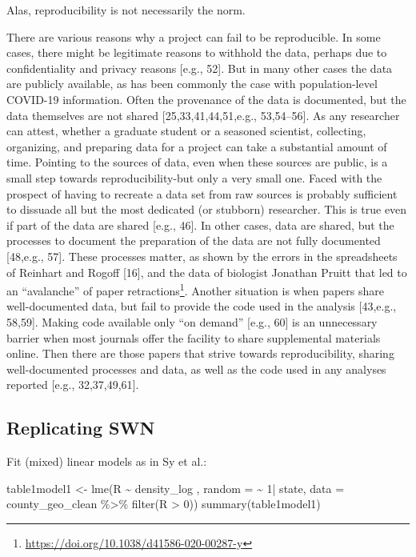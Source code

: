 \documentclass[10pt,letterpaper]{article}
\newenvironment{Shaded}{\begin{snugshade}}{\end{snugshade}}
\newcommand{\AttributeTok}[1]{\textcolor[rgb]{0.77,0.63,0.00}{#1}}
\newcommand{\DecValTok}[1]{\textcolor[rgb]{0.00,0.00,0.81}{#1}}
\newcommand{\FunctionTok}[1]{\textcolor[rgb]{0.00,0.00,0.00}{#1}}
\newcommand{\NormalTok}[1]{#1}
\newcommand{\OtherTok}[1]{\textcolor[rgb]{0.56,0.35,0.01}{#1}}
\newcommand{\SpecialCharTok}[1]{\textcolor[rgb]{0.00,0.00,0.00}{#1}}
\begin{document}
Alas, reproducibility is not necessarily the norm.

There are various reasons why a project can fail to be reproducible. In
some cases, there might be legitimate reasons to withhold the data,
perhaps due to confidentiality and privacy reasons {[}e.g., 52{]}. But
in many other cases the data are publicly available, as has been
commonly the case with population-level COVID-19 information. Often the
provenance of the data is documented, but the data themselves are not
shared {[}25,33,41,44,51,e.g., 53,54--56{]}. As any researcher can
attest, whether a graduate student or a seasoned scientist, collecting,
organizing, and preparing data for a project can take a substantial
amount of time. Pointing to the sources of data, even when these sources
are public, is a small step towards reproducibility-but only a very
small one. Faced with the prospect of having to recreate a data set from
raw sources is probably sufficient to dissuade all but the most
dedicated (or stubborn) researcher. This is true even if part of the
data are shared {[}e.g., 46{]}. In other cases, data are shared, but the
processes to document the preparation of the data are not fully
documented {[}48,e.g., 57{]}. These processes matter, as shown by the
errors in the spreadsheets of Reinhart and Rogoff {[}16{]}, and the data
of biologist Jonathan Pruitt that led to an ``avalanche'' of paper
retractions\footnote{\url{https://doi.org/10.1038/d41586-020-00287-y}}.
Another situation is when papers share well-documented data, but fail to
provide the code used in the analysis {[}43,e.g., 58,59{]}. Making code
available only ``on demand'' {[}e.g., 60{]} is an unnecessary barrier
when most journals offer the facility to share supplemental materials
online. Then there are those papers that strive towards reproducibility,
sharing well-documented processes and data, as well as the code used in
any analyses reported {[}e.g., 32,37,49,61{]}.

\hypertarget{replicating-swn}{%
\subsection{Replicating SWN}\label{replicating-swn}}

Fit (mixed) linear models as in Sy et al.:

\begin{Shaded}
\begin{Highlighting}[]
\NormalTok{table1model1 }\OtherTok{\textless{}{-}} \FunctionTok{lme}\NormalTok{(R }\SpecialCharTok{\textasciitilde{}}\NormalTok{ density\_log , }
                    \AttributeTok{random =} \SpecialCharTok{\textasciitilde{}} \DecValTok{1}\SpecialCharTok{|}\NormalTok{ state, }
                    \AttributeTok{data =}\NormalTok{ county\_geo\_clean }\SpecialCharTok{\%\textgreater{}\%}
                      \FunctionTok{filter}\NormalTok{(R }\SpecialCharTok{\textgreater{}} \DecValTok{0}\NormalTok{))}
\FunctionTok{summary}\NormalTok{(table1model1)}
\end{Highlighting}
\end{Shaded}
\end{document}
